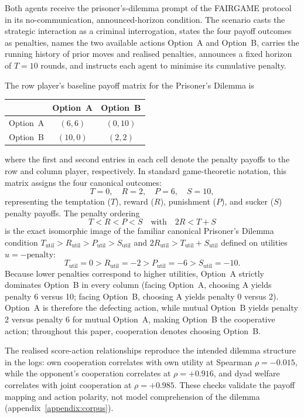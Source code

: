 \documentclass[11pt,a4paper]{article}
\begin{document}
Both agents receive the prisoner's-dilemma prompt of the FAIRGAME
protocol~\cite{buscemi2025fairgame} in its no-communication, announced-horizon
condition. The scenario casts the strategic interaction as a criminal
interrogation, states the four payoff outcomes as penalties, names the two
available actions Option~A and Option~B, carries the running history of prior
moves and realised penalties, announces a fixed horizon of $T = 10$ rounds, and
instructs each agent to minimise its cumulative penalty.

The row player's baseline payoff matrix for the Prisoner's Dilemma is
\begin{center}
\small
\begin{tabular}{c|cc}
 & Option~A & Option~B \\
\hline
Option~A & $(6, 6)$ & $(0, 10)$ \\
Option~B & $(10, 0)$ & $(2, 2)$
\end{tabular}
\end{center}
where the first and second entries in each cell denote the penalty payoffs to
the row and column player, respectively. In standard game-theoretic notation,
this matrix assigns the four canonical outcomes:
\[
T = 0, \quad R = 2, \quad P = 6, \quad S = 10,
\]
representing the temptation ($T$), reward ($R$), punishment ($P$), and sucker
($S$) penalty payoffs. The penalty ordering
\[
T < R < P < S \quad \text{with} \quad 2R < T + S
\]
is the exact isomorphic image of the familiar canonical Prisoner's Dilemma
condition $T_{\text{util}} > R_{\text{util}} > P_{\text{util}} > S_{\text{util}}$
and $2R_{\text{util}} > T_{\text{util}} + S_{\text{util}}$ defined on utilities
$u = -\text{penalty}$:
\[
T_{\text{util}} = 0 > R_{\text{util}} = -2 > P_{\text{util}} = -6 > S_{\text{util}} = -10.
\]
Because lower penalties correspond to higher utilities, Option~A strictly
dominates Option~B in every column (facing Option~A, choosing A yields penalty 6
versus 10; facing Option~B, choosing A yields penalty 0 versus 2). Option~A is
therefore the defecting action, while mutual Option~B yields penalty 2 versus
penalty 6 for mutual Option~A, making Option~B the cooperative action;
throughout this paper, cooperation denotes choosing Option~B.

The realised score-action relationships reproduce the intended dilemma
structure in the logs: own cooperation correlates with own utility at Spearman
$\rho = -0.015$, while the opponent's cooperation correlates at
$\rho = +0.916$, and dyad welfare correlates with joint cooperation at
$\rho = +0.985$. These checks validate the payoff mapping and action polarity,
not model comprehension of the dilemma (appendix~\ref{appendix:corpus}).
\end{document}
